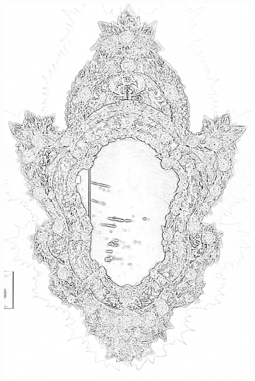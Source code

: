 \documentclass[hidelinks,12pt,a4paper]{article}
\begin{document}
\begin{adjustwidth}{-30mm}{-30mm}
			\thispagestyle{empty}
			\begin{minipage}{0.94\linewidth}
				\centering
				\includegraphics[scale=0.8]{Specchio_di_Murano.jpg}
			\end{minipage}
			
			\vspace*{\fill}
			\newpage
			

\end{adjustwidth}
\end{document}
